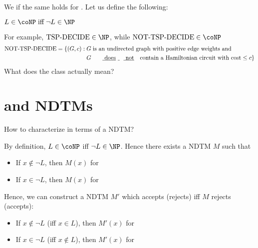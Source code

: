 \documentclass[a4paper]{report}
\theoremstyle{definition}
\begin{document}
We  if the same holds for \NP{}. Let us define the following:

$L \in \coNP \;\text{iff} \; \neg L \in \NP$

For example, $\text{TSP-DECIDE} \in \NP$, while $\text{NOT-TSP-DECIDE} \in \coNP$
%
\begin{align*}
\text{NOT-TSP-DECIDE} = \{(G, c) : & \;G \;\text{is an undirected graph with positive edge weights and}\\ &\; G \;\text{\myul{does not} contain a Hamiltonian circuit with cost} \leq c\}
\end{align*}
%
What does the class \coNP{} actually mean?

\section{\coNP{} and NDTMs}
%
How to characterize \coNP{} in terms of a NDTM?

By definition, $L \in \coNP$ iff $\neg L \in \NP$. Hence there exists a NDTM $M$ such that
\begin{itemize}
\item If $x \not\in \neg L$, then $M(x)$  for 
\item If $x \in \neg L$, then $M(x)$  for 
\end{itemize}

Hence, we can construct a NDTM $M'$ which accepts (rejects) iff $M$ rejects (accepts):
\begin{itemize}
\item If $x \not\in \neg L$ (iff $x \in L$), then $M'(x)$  for 
\item If $x \in \neg L$ (iff $x \not\in L$), then $M'(x)$  for 
\end{itemize}
\end{document}
